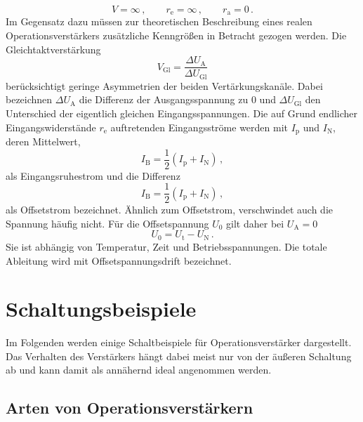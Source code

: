 \documentclass[
  bibliography=totoc,     %
  captions=tableheading,  %
  titlepage=firstiscover, %
]{scrartcl}
\begin{document}
\begin{equation}
\label{eq:id-verstärker}
    V = \infty\,,\qquad r_\text{e} = \infty\,,\qquad r_\text{a} = 0\,.
\end{equation}
\noindent
Im Gegensatz dazu müssen zur theoretischen Beschreibung eines realen
Operationsverstärkers zusätzliche Kenngrößen in Betracht gezogen werden.
\noindent
Die Gleichtaktverstärkung
\begin{equation}
\label{eq:gleichtaktverstärkung}
    V_\text{Gl} = \frac{\Delta U_\text{A}}{\Delta U_\text{Gl}}
\end{equation}
berücksichtigt geringe Asymmetrien der beiden Vertärkungskanäle.
Dabei bezeichnen $\Delta U_\text{A}$ die Differenz der Ausgangsspannung zu
\num{0} und $\Delta U_\text{Gl}$ den Unterschied der eigentlich gleichen
Eingangsspannungen.
\noindent
Die auf Grund endlicher Eingangswiderstände $r_\text{e}$ auftretenden
Eingangsströme werden mit $I_\text{p}$ und $I_\text{N}$, deren
Mittelwert,
\begin{equation}
\label{eq:eingangsruhestrom}
    I_\text{B} = \frac{1}{2}\left(I_\text{p} + I_\text{N}\right)\,,
\end{equation}
als Eingangsruhestrom und die Differenz
\begin{equation}
\label{eq:offsetstrom}
    I_\text{B} = \frac{1}{2}\left(I_\text{p} + I_\text{N}\right)\,,
\end{equation}
als Offsetstrom bezeichnet.
Ähnlich zum Offsetstrom, verschwindet auch die Spannung häufig nicht.
Für die Offsetspannung $U_0$ gilt daher bei $U_\text{A} = 0$
\begin{equation}
\label{eq:offsetspannung}
    U_0 = U_\text{t} - U_\text{N}\,.
\end{equation}
Sie ist abhängig von Temperatur, Zeit und Betriebsspannungen. Die totale
Ableitung wird mit Offsetspannungsdrift bezeichnet.


\section{Schaltungsbeispiele}
\label{sec:schaltungsbeispiele}
Im Folgenden werden einige Schaltbeispiele für Operationsverstärker
dargestellt. Das Verhalten des Verstärkers hängt dabei meist nur von der
äußeren Schaltung ab und kann damit als annähernd ideal angenommen werden.

\subsection{Arten von Operationsverstärkern}
\end{document}
